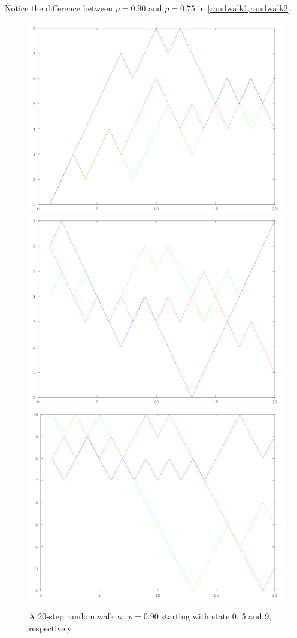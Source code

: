 Notice the difference between $p=0.90$ and $p=0.75$ in \cref{randwalk1,randwalk2}.
\begin{figure}[!htbp]
  \includegraphics[width=\textwidth/2]{randwalk0.png}
  \includegraphics[width=\textwidth/2]{randwalk5.png}
  \includegraphics[width=\textwidth/1]{randwalk9.png}
  \caption{A 20-step random walk w. $p=0.90$ starting with state 0, 5 and 9, respectively.}
  \label{randwalk1}
\end{figure}


